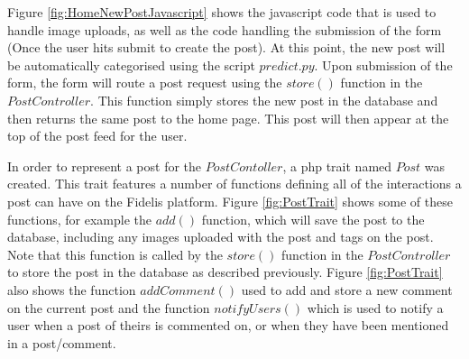 Figure \ref{fig:HomeNewPostJavascript} shows the javascript code that is used to handle image uploads, as well as the code handling the submission of the form (Once the user hits submit to create the post). At this point, the new post will be automatically categorised using the script $predict.py$. Upon submission of the form, the form will route a post request using the $store()$ function in the $PostController$. This function simply stores the new post in the database and then returns the same post to the home page. This post will then appear at the top of the post feed for the user.

In order to represent a post for the $PostContoller$, a php trait named $Post$ was created. This trait features a number of functions defining all of the interactions a post can have on the Fidelis platform. Figure \ref{fig:PostTrait} shows some of these functions, for example the $add()$ function, which will save the post to the database, including any images uploaded with the post and tags on the post. Note that this function is called by the $store()$ function in the $PostController$ to store the post in the database as described previously. Figure \ref{fig:PostTrait} also shows the function $addComment()$ used to add and store a new comment on the current post and the function $notifyUsers()$ which is used to notify a user when a post of theirs is commented on, or when they have been mentioned in a post/comment.

